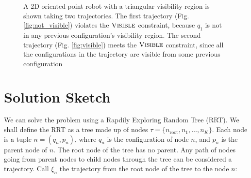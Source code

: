 \documentclass[conference]{IEEEtran}
\begin{document}
 \begin{figure}[!ht]
    \hfill
    \caption{A 2D oriented point robot with a triangular visibility region is
    shown taking two trajectories. The first trajectory (Fig.
    \ref{fig:not_visible}) violates the $\textsc{Visible}$ constraint, because $q_1$ is
    not in any previous configuration's visibility region. The second trajectory
    (Fig. \ref{fig:visible}) meets the $\textsc{Visible}$ constraint, since all the
     configurations in the trajectory are visible from some
    previous configuration}
    \label{fig:visibility}
  \end{figure}

\section{Solution Sketch}

We can solve the problem using a Rapdily Exploring Random Tree (RRT). We shall
define the RRT as a tree made up of nodes $\tau = \{n_{\text{root}}, n_1,
\ldots, n_K\}$.
Each node is a tuple $n = (q_n, p_n)$, where $q_n$ is the configuration of node $n$, and
$p_n$ is the parent node of $n$. The root node of the tree has no parent. Any
path of nodes going from parent nodes to child nodes through the tree can be
considered a trajectory. Call $\xi_n$ the trajectory from the root node of the
tree to the node $n$: 
\end{document}
